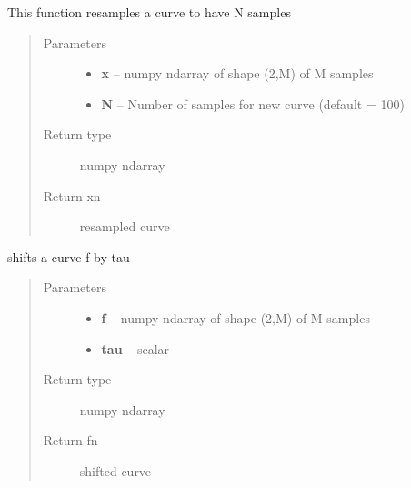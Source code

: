 \documentclass[letterpaper,10pt,english]{sphinxmanual}
\begin{document}

\begin{fulllineitems}
\label{curve_functions:curve_functions.resamplecurve}
This function resamples a curve to have N samples
\begin{quote}\begin{description}
\item[{Parameters}] \leavevmode\begin{itemize}
\item {} 
\textbf{x} -- numpy ndarray of shape (2,M) of M samples

\item {} 
\textbf{N} -- Number of samples for new curve (default = 100)

\end{itemize}

\item[{Return type}] \leavevmode
numpy ndarray

\item[{Return xn}] \leavevmode
resampled curve

\end{description}\end{quote}

\end{fulllineitems}


\begin{fulllineitems}
\label{curve_functions:curve_functions.shift_f}
shifts a curve f by tau
\begin{quote}\begin{description}
\item[{Parameters}] \leavevmode\begin{itemize}
\item {} 
\textbf{f} -- numpy ndarray of shape (2,M) of M samples

\item {} 
\textbf{tau} -- scalar

\end{itemize}

\item[{Return type}] \leavevmode
numpy ndarray

\item[{Return fn}] \leavevmode
shifted curve

\end{description}\end{quote}

\end{fulllineitems}
\end{document}
